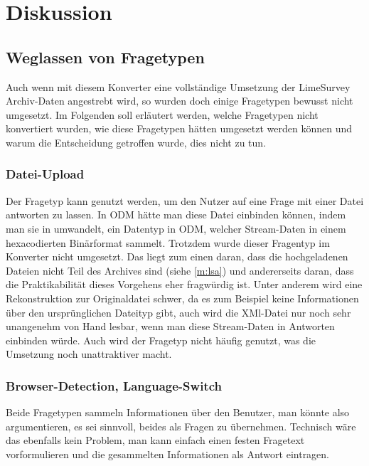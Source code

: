 \chapter{Diskussion}
\label{ch:diskussion}



\section{Weglassen von Fragetypen}
\label{d:leave}

Auch wenn mit diesem Konverter eine vollständige Umsetzung der LimeSurvey Archiv-Daten angestrebt wird, so wurden doch einige Fragetypen bewusst nicht umgesetzt.
Im Folgenden soll erläutert werden, welche Fragetypen nicht konvertiert wurden, wie diese Fragetypen hätten umgesetzt werden können und warum die Entscheidung getroffen wurde, dies nicht zu tun.

\subsection{Datei-Upload}

Der Fragetyp  kann genutzt werden, um den Nutzer auf eine Frage mit einer Datei antworten zu lassen.
In ODM hätte man diese Datei einbinden können, indem man sie in  umwandelt, ein Datentyp in ODM, welcher Stream-Daten in einem hexacodierten Binärformat sammelt.
Trotzdem wurde dieser Fragentyp im Konverter nicht umgesetzt.
Das liegt zum einen daran, dass die hochgeladenen Dateien nicht Teil des Archives sind (siehe \cref{m:lsa}) und andererseits daran, dass die Praktikabilität dieses Vorgehens eher fragwürdig ist.
Unter anderem wird eine Rekonstruktion zur Originaldatei schwer, da es zum Beispiel keine Informationen über den ursprünglichen Dateityp gibt, auch wird die XMl-Datei nur noch sehr unangenehm von Hand lesbar, wenn man diese Stream-Daten in Antworten einbinden würde. 
Auch wird der Fragetyp nicht häufig genutzt, was die Umsetzung noch unattraktiver macht.

\subsection{Browser-Detection, Language-Switch}

Beide Fragetypen sammeln Informationen über den Benutzer, man könnte also argumentieren, es sei sinnvoll, beides als Fragen zu übernehmen.
Technisch wäre das ebenfalls kein Problem, man kann einfach einen festen Fragetext vorformulieren und die gesammelten Informationen als Antwort eintragen.

